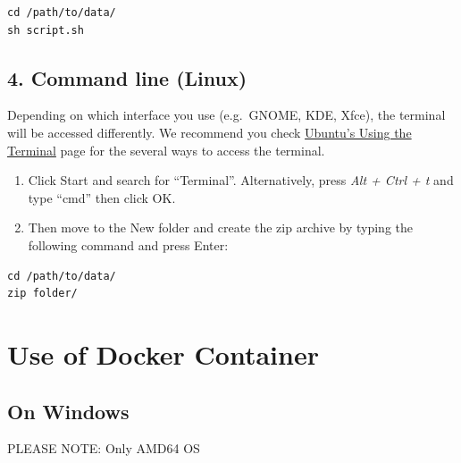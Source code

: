 \documentclass[
  a4paper,
  DIV=11,
  numbers=noendperiod,
  oneside,
  open=any]{scrreport}
\providecommand{\tightlist}{%
  \setlength{\itemsep}{0pt}\setlength{\parskip}{0pt}}\usepackage{longtable,booktabs,array}
\begin{document}
\begin{verbatim}
cd /path/to/data/
sh script.sh
\end{verbatim}

\section{4. Command line (Linux)}\label{command-line-linux}

Depending on which interface you use (e.g.~GNOME, KDE, Xfce), the
terminal will be accessed differently. We recommend you check
\href{https://help.ubuntu.com/community/UsingTheTerminal?action=show&redirect=BasicCommands}{Ubuntu's
Using the Terminal} page for the several ways to access the terminal.

\begin{enumerate}
\def\labelenumi{\arabic{enumi}.}
\tightlist
\item
  Click Start and search for ``Terminal''. Alternatively, press
  \emph{Alt + Ctrl + t} and type ``cmd'' then click OK.
\item
  Then move to the New folder and create the zip archive by typing the
  following command and press Enter:
\end{enumerate}

\begin{verbatim}
cd /path/to/data/
zip folder/
\end{verbatim}

\chapter{Use of Docker Container}\label{sec-docker}

\section{On Windows}\label{on-windows}

\begin{tcolorbox}[enhanced jigsaw, opacityback=0, toprule=.15mm, bottomtitle=1mm, colback=white, rightrule=.15mm, breakable, coltitle=black, colbacktitle=quarto-callout-caution-color!10!white, toptitle=1mm, arc=.35mm, colframe=quarto-callout-caution-color-frame, bottomrule=.15mm, opacitybacktitle=0.6, titlerule=0mm, leftrule=.75mm, title=\textcolor{quarto-callout-caution-color}{\faFire}\hspace{0.5em}{Caution}, left=2mm]

PLEASE NOTE: Only AMD64 OS

\end{tcolorbox}
\end{document}
